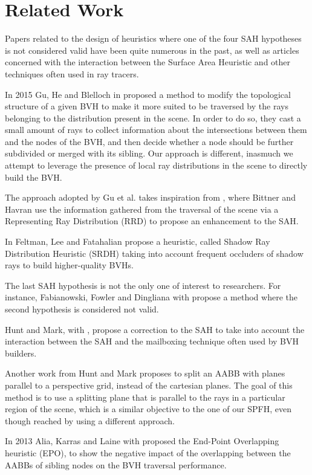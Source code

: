 \documentclass[acmtog, anonymous, review]{acmart}
\begin{document}
\section{Related Work}
Papers related to the design of heuristics where one of the four SAH hypotheses is not considered valid have been quite numerous in the past, as well as articles concerned with the interaction between the Surface Area Heuristic and other techniques often used in ray tracers.

In 2015 Gu, He and Blelloch in \cite{contractions} proposed a method to modify the topological structure of a given BVH to make it more suited to be traversed by the rays belonging to the distribution present in the scene. In order to do so, they cast a small amount of rays to collect information about the intersections between them and the nodes of the BVH, and then decide whether a node should be further subdivided or merged with its sibling. Our approach is different, inasmuch we attempt to leverage the presence of local ray distributions in the scene to directly build the BVH.

The approach adopted by Gu et al. takes inspiration from \cite{bittner_havran}, where Bittner and Havran use the information gathered from the traversal of the scene via a Representing Ray Distribution (RRD) to propose an enhancement to the SAH.

In \cite{srdh} Feltman, Lee and Fatahalian propose a heuristic, called Shadow Ray Distribution Heuristic (SRDH) taking into account frequent occluders of shadow rays to build higher-quality BVHs.

The last SAH hypothesis is not the only one of interest to researchers. For instance, Fabianowski, Fowler and Dingliana with \cite{interior_rays} propose a method where the second hypothesis is considered not valid.

Hunt and Mark, with \cite{mailboxing}, propose a correction to the SAH to take into account the interaction between the SAH and the mailboxing technique often used by BVH builders.

Another work \cite{perspective_planes} from Hunt and Mark proposes to split an AABB with planes parallel to a perspective grid, instead of the cartesian planes. The goal of this method is to use a splitting plane that is parallel to the rays in a particular region of the scene, which is a similar objective to the one of our SPFH, even though reached by using a different approach.

In 2013 Alia, Karras and Laine with \cite{overlapping_heuristic} proposed the End-Point Overlapping heuristic (EPO), to show the negative impact of the overlapping between the AABBs of sibling nodes on the BVH traversal performance.
\end{document}
